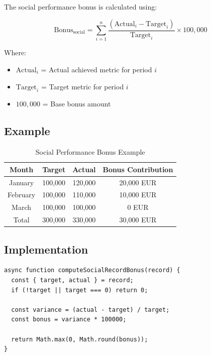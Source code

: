 \documentclass[11pt,a4paper,oneside,openany]{book}
\begin{document}
The social performance bonus is calculated using:

\[
\text{Bonus}_{\text{social}} = \sum_{i=1}^{n} \frac{(\text{Actual}_i - \text{Target}_i)}{\text{Target}_i} \times 100,000
\]

Where:
\begin{itemize}
    \item $\text{Actual}_i$ = Actual achieved metric for period $i$
    \item $\text{Target}_i$ = Target metric for period $i$
    \item $100,000$ = Base bonus amount
\end{itemize}

\subsection{Example}

\begin{table}[H]
\centering
\begin{tabular}{|c|c|c|c|}
\hline
\textbf{Month} & \textbf{Target} & \textbf{Actual} & \textbf{Bonus Contribution} \\
\hline
January & 100,000 & 120,000 & 20,000 EUR \\
February & 100,000 & 110,000 & 10,000 EUR \\
March & 100,000 & 100,000 & 0 EUR \\
\hline
Total & 300,000 & 330,000 & 30,000 EUR \\
\hline
\end{tabular}
\caption{Social Performance Bonus Example}
\end{table}

\subsection{Implementation}

\noindent\begin{minipage}{\linewidth}
\begin{lstlisting}[caption=Bonus Calculation Implementation]
async function computeSocialRecordBonus(record) {
  const { target, actual } = record;
  if (!target || target === 0) return 0;
  
  const variance = (actual - target) / target;
  const bonus = variance * 100000;
  
  return Math.max(0, Math.round(bonus));
}
\end{lstlisting}
\end{minipage}
\end{document}
